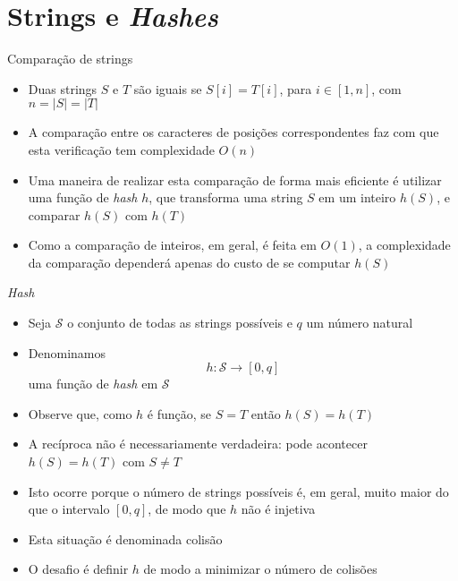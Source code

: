 \section{Strings e {\it Hashes}}

\begin{frame}[fragile]{Comparação de strings}

    \begin{itemize}
        \item Duas strings $S$ e $T$ são iguais se $S[i] = T[i]$, para $i\in [1,n]$, com
            $n = |S| = |T|$
        \pause

        \item A comparação entre os caracteres de posições correspondentes faz com que esta
            verificação tem complexidade $O(n)$
        \pause

        \item Uma maneira de realizar esta comparação de forma mais eficiente é utilizar uma 
            função de 
            \textit{hash} $h$, que transforma uma string $S$ em um inteiro $h(S)$, e comparar
            $h(S)$ com $h(T)$
        \pause

        \item Como a comparação de inteiros, em geral, é feita em $O(1)$, a complexidade da 
            comparação dependerá apenas do custo de se computar $h(S)$
    \end{itemize}

\end{frame}

\begin{frame}[fragile]{{\it Hash}}

    \begin{itemize}
        \item Seja $\mathcal{S}$ o conjunto de todas as strings possíveis e $q$ um número natural
        \pause

        \item Denominamos
        \[
            h: \mathcal{S} \to [0,q]
        \]
        uma função de \textit{hash} em $\mathcal{S}$
        \pause

        \item Observe que, como $h$ é função, se $S = T$ então $h(S) = h(T)$
        \pause

        \item A recíproca não é necessariamente verdadeira: pode acontecer $h(S) = h(T)$ com
            $S\neq T$
        \pause

        \item Isto ocorre porque o número de strings possíveis é, em geral, muito maior do que
            o intervalo $[0,q]$, de modo que $h$ não é injetiva
        \pause

        \item Esta situação é denominada colisão
        \pause

        \item O desafio é definir $h$ de modo a minimizar o número de colisões

    \end{itemize}

\end{frame}
